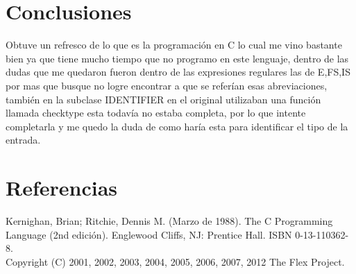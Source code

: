 \documentclass{article}
\begin{document}
	\section{Conclusiones}
		Obtuve un refresco de lo que es la programación en C lo cual me vino bastante bien ya que tiene mucho tiempo que no programo en este lenguaje, dentro de las dudas que me quedaron fueron dentro de las expresiones regulares las de E,FS,IS por mas que busque no logre encontrar a que se referían esas abreviaciones, también en la subclase IDENTIFIER en el original utilizaban una función llamada checktype esta todavía no estaba completa, por lo que intente completarla y me quedo la duda de como haría esta para identificar el tipo de la entrada.
	\section{Referencias}
	Kernighan, Brian; Ritchie, Dennis M. (Marzo de 1988). The C Programming Language (2nd edición). Englewood Cliffs, NJ: Prentice Hall. ISBN 0-13-110362-8.\\
	Copyright (C) 2001, 2002, 2003, 2004, 2005, 2006, 2007, 2012 The Flex
	Project.
	
\end{document}
